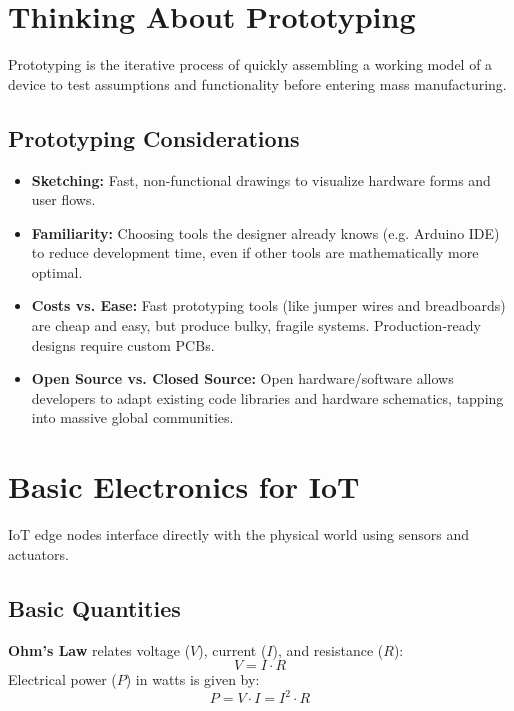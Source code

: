 \documentclass[12pt,a4paper]{article}
\begin{document}
\section{Thinking About Prototyping}

Prototyping is the iterative process of quickly assembling a working model of a device to test assumptions and functionality before entering mass manufacturing.

\subsection{Prototyping Considerations}
\begin{itemize}[leftmargin=*, itemsep=3pt]
  \item \textbf{Sketching:} Fast, non-functional drawings to visualize hardware forms and user flows.
  \item \textbf{Familiarity:} Choosing tools the designer already knows (e.g. Arduino IDE) to reduce development time, even if other tools are mathematically more optimal.
  \item \textbf{Costs vs. Ease:} Fast prototyping tools (like jumper wires and breadboards) are cheap and easy, but produce bulky, fragile systems. Production-ready designs require custom PCBs.
  \item \textbf{Open Source vs. Closed Source:} Open hardware/software allows developers to adapt existing code libraries and hardware schematics, tapping into massive global communities.
\end{itemize}

\section{Basic Electronics for IoT}

IoT edge nodes interface directly with the physical world using sensors and actuators.

\subsection{Basic Quantities}
\begin{tcolorbox}[formulabox, title={Ohm's Law and Electrical Power}]
  \textbf{Ohm's Law} relates voltage ($V$), current ($I$), and resistance ($R$):
  \begin{equation}
    V = I \cdot R
  \end{equation}
  Electrical power ($P$) in watts is given by:
  \begin{equation}
    P = V \cdot I = I^2 \cdot R
  \end{equation}
\end{tcolorbox}
\end{document}
